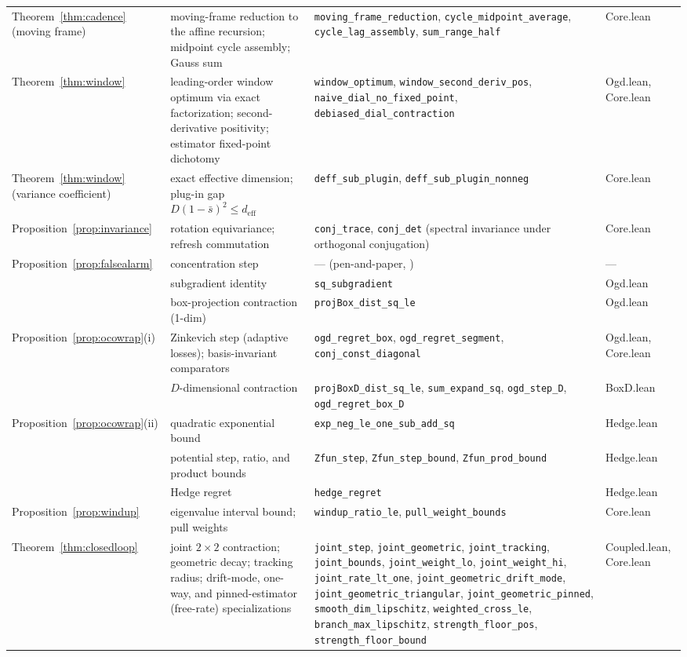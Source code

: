 {\begin{longtable}{@{}p{1.02in} p{1.12in} p{1.9in} l@{}}
Theorem~\ref{thm:cadence} (moving frame) & moving-frame reduction to the affine recursion; midpoint cycle assembly; Gauss sum & \texttt{moving\_frame\_reduction}, \texttt{cycle\_midpoint\_average}, \texttt{cycle\_lag\_assembly}, \texttt{sum\_range\_half} & Core.lean \\
Theorem~\ref{thm:window} & leading-order window optimum via exact factorization; second-derivative positivity; estimator fixed-point dichotomy & \texttt{window\_optimum}, \texttt{window\_second\_deriv\_pos}, \texttt{naive\_dial\_no\_fixed\_point}, \texttt{debiased\_dial\_contraction} & Ogd.lean, Core.lean \\
Theorem~\ref{thm:window} (variance coefficient) & exact effective dimension; plug-in gap $D(1-\bar s)^2 \le d_{\mathrm{eff}}$ & \texttt{deff\_sub\_plugin}, \texttt{deff\_sub\_plugin\_nonneg} & Core.lean \\
Proposition~\ref{prop:invariance} & rotation equivariance; refresh commutation & \texttt{conj\_trace}, \texttt{conj\_det} (spectral invariance under orthogonal conjugation) & Core.lean \\
Proposition~\ref{prop:falsealarm} & concentration step & --- (pen-and-paper, \citep{freedman1975}) & --- \\
 & subgradient identity & \texttt{sq\_subgradient} & Ogd.lean \\
 & box-projection contraction (1-dim) & \texttt{projBox\_dist\_sq\_le} & Ogd.lean \\
Proposition~\ref{prop:ocowrap}(i) & Zinkevich step (adaptive losses); basis-invariant comparators & \texttt{ogd\_regret\_box}, \texttt{ogd\_regret\_segment}, \texttt{conj\_const\_diagonal} & Ogd.lean, Core.lean \\
 & $D$-dimensional contraction & \texttt{projBoxD\_dist\_sq\_le}, \texttt{sum\_expand\_sq}, \texttt{ogd\_step\_D}, \texttt{ogd\_regret\_box\_D} & BoxD.lean \\
Proposition~\ref{prop:ocowrap}(ii) & quadratic exponential bound & \texttt{exp\_neg\_le\_one\_sub\_add\_sq} & Hedge.lean \\
 & potential step, ratio, and product bounds & \texttt{Zfun\_step}, \texttt{Zfun\_step\_bound}, \texttt{Zfun\_prod\_bound} & Hedge.lean \\
 & Hedge regret & \texttt{hedge\_regret} & Hedge.lean \\
Proposition~\ref{prop:windup} & eigenvalue interval bound; pull weights & \texttt{windup\_ratio\_le}, \texttt{pull\_weight\_bounds} & Core.lean \\
Theorem~\ref{thm:closedloop} & joint $2\times2$ contraction; geometric decay; tracking radius; drift-mode, one-way, and pinned-estimator (free-rate) specializations & \texttt{joint\_step}, \texttt{joint\_geometric}, \texttt{joint\_tracking}, \texttt{joint\_bounds}, \texttt{joint\_weight\_lo}, \texttt{joint\_weight\_hi}, \texttt{joint\_rate\_lt\_one}, \texttt{joint\_geometric\_drift\_mode}, \texttt{joint\_geometric\_triangular}, \texttt{joint\_geometric\_pinned}, \texttt{smooth\_dim\_lipschitz}, \texttt{weighted\_cross\_le}, \texttt{branch\_max\_lipschitz}, \texttt{strength\_floor\_pos}, \texttt{strength\_floor\_bound} & Coupled.lean, Core.lean \\

\end{longtable}}
